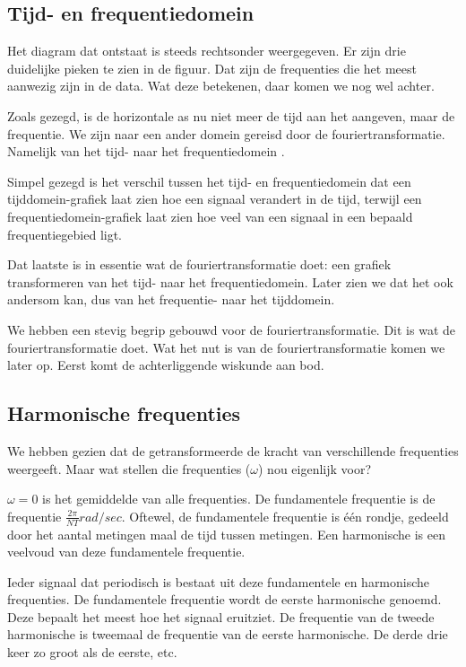\documentclass[11pt,fleqn]{book} %
\begin{document}
\subsection{Tijd- en frequentiedomein}
Het diagram dat ontstaat is steeds rechtsonder weergegeven. Er zijn drie duidelijke pieken te zien in de figuur. Dat zijn de frequenties die het meest aanwezig zijn in de data. Wat deze betekenen, daar komen we nog wel achter.

Zoals gezegd, is de horizontale as nu niet meer de tijd aan het aangeven, maar de frequentie. We zijn naar een ander domein gereisd door de fouriertransformatie. Namelijk van het tijd- naar het frequentiedomein \cite{fd}.

Simpel gezegd is het verschil tussen het tijd- en frequentiedomein dat een tijddomein-grafiek laat zien hoe een signaal verandert in de tijd, terwijl een frequentiedomein-grafiek laat zien hoe veel van een signaal in een bepaald frequentiegebied ligt.

Dat laatste is in essentie wat de fouriertransformatie doet: een grafiek transformeren van het tijd- naar het frequentiedomein. Later zien we dat het ook andersom kan, dus van het frequentie- naar het tijddomein.

We hebben een stevig begrip gebouwd voor de fouriertransformatie. Dit is wat de fouriertransformatie doet. Wat het nut is van de fouriertransformatie komen we later op. Eerst komt de achterliggende wiskunde aan bod.

\subsection{Harmonische frequenties}
We hebben gezien dat de getransformeerde de kracht van verschillende frequenties weergeeft. Maar wat stellen die frequenties ($\omega$) nou eigenlijk voor?

$\omega=0$ is het gemiddelde van alle frequenties. De fundamentele frequentie is de frequentie $\frac{2\pi}{NT} rad/sec$. Oftewel, de fundamentele frequentie is één rondje, gedeeld door het aantal metingen maal de tijd tussen metingen. Een harmonische is een veelvoud van deze fundamentele frequentie.

Ieder signaal dat periodisch is bestaat uit deze fundamentele en harmonische frequenties. De fundamentele frequentie wordt de eerste harmonische genoemd. Deze bepaalt het meest hoe het signaal eruitziet. De frequentie van de tweede harmonische is tweemaal de frequentie van de eerste harmonische. De derde drie keer zo groot als de eerste, etc.
\end{document}
